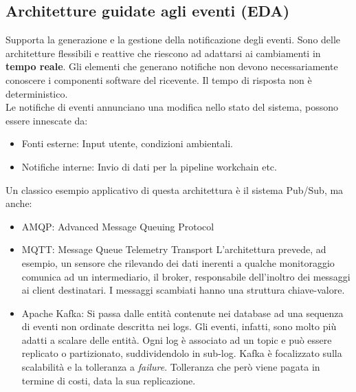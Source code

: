 \documentclass{article}
\begin{document}
		\subsection{Architetture guidate agli eventi (EDA)}
		Supporta la generazione e la gestione della notificazione degli eventi. Sono delle architetture flessibili e reattive che riescono ad adattarsi ai cambiamenti in \textbf{tempo reale}.
		Gli elementi che generano notifiche non devono necessariamente conoscere i componenti software del ricevente. Il tempo di risposta non è deterministico.
		\\
		Le notifiche di eventi annunciano una modifica nello stato del sistema, possono essere innescate da:
		\begin{itemize}
		    \item Fonti esterne: Input utente, condizioni ambientali.
		    \item Notifiche interne: Invio di dati per la pipeline workchain etc.
		\end{itemize}
		Un classico esempio applicativo di questa architettura è il sistema Pub/Sub, ma anche:
		\begin{itemize}
		    \item AMQP: Advanced Message Queuing Protocol
		    \item MQTT: Message Queue Telemetry Transport
		    L'architettura prevede, ad esempio, un sensore che rilevando dei dati inerenti a qualche monitoraggio comunica ad un intermediario, il broker, responsabile dell'inoltro dei messaggi ai client destinatari. I messaggi scambiati hanno una struttura chiave-valore.
		    \item Apache Kafka: Si passa dalle entità contenute nei database ad una sequenza di eventi non ordinate descritta nei logs.
		    Gli eventi, infatti, sono molto più adatti a scalare delle entità. Ogni log è associato ad un topic e può essere replicato o partizionato, suddividendolo in sub-log.
		    Kafka è focalizzato sulla scalabilità e la tolleranza a \textit{failure}. Tolleranza che però viene pagata in termine di costi, data la sua replicazione.
		\end{itemize}
		
\end{document}
